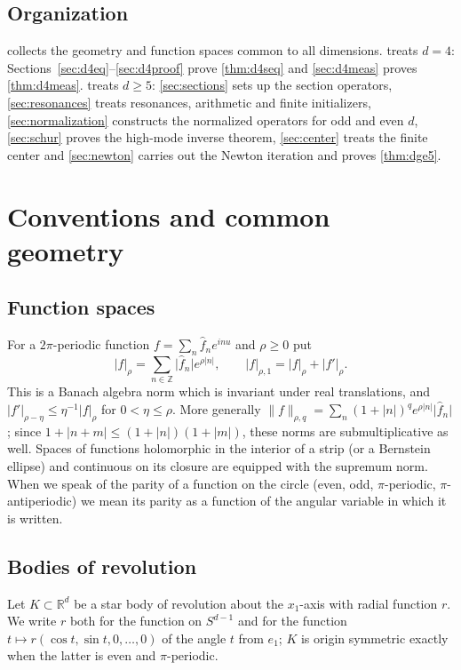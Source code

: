 \documentclass[11pt]{amsart}
\numberwithin{equation}{section}
\theoremstyle{definition}
\theoremstyle{remark}
\newcommand{\R}{\mathbb{R}}
\newcommand{\Z}{\mathbb{Z}}
\newcommand{\abs}[1]{\lvert #1\rvert}
\newcommand{\norm}[1]{\lVert #1\rVert}
\begin{document}
\subsection{Organization}
 collects the geometry and function spaces common to all dimensions.  treats $d=4$: Sections~\ref{sec:d4eq}--\ref{sec:d4proof} prove \cref{thm:d4seq} and \cref{sec:d4meas} proves \cref{thm:d4meas}.  treats $d\ge5$: \cref{sec:sections} sets up the section operators, \cref{sec:resonances} treats resonances, arithmetic and finite initializers, \cref{sec:normalization} constructs the normalized operators for odd and even $d$, \cref{sec:schur} proves the high-mode inverse theorem, \cref{sec:center} treats the finite center and \cref{sec:newton} carries out the Newton iteration and proves \cref{thm:dge5}.

\section{Conventions and common geometry}\label{sec:geometry}

\subsection{Function spaces}
For a $2\pi$-periodic function $f=\sum_n\hat f_ne^{inu}$ and $\rho\ge0$ put
\[
\abs{f}_{\rho}=\sum_{n\in\Z}\abs{\hat f_n}e^{\rho\abs n},\qquad \abs{f}_{\rho,1}=\abs f_\rho+\abs{f'}_\rho .
\]
This is a Banach algebra norm which is invariant under real translations, and $\abs{f'}_{\rho-\eta}\le\eta^{-1}\abs f_\rho$ for $0<\eta\le\rho$. More generally $\norm f_{\rho,q}=\sum_n(1+\abs n)^q e^{\rho\abs n}\abs{\hat f_n}$; since $1+\abs{n+m}\le(1+\abs n)(1+\abs m)$, these norms are submultiplicative as well. Spaces of functions holomorphic in the interior of a strip (or a Bernstein ellipse) and continuous on its closure are equipped with the supremum norm. When we speak of the parity of a function on the circle (even, odd, $\pi$-periodic, $\pi$-antiperiodic) we mean its parity as a function of the angular variable in which it is written.

\subsection{Bodies of revolution}
Let $K\subset\R^d$ be a star body of revolution about the $x_1$-axis with radial function $r$. We write $r$ both for the function on $S^{d-1}$ and for the function $t\mapsto r(\cos t,\sin t,0,\dots,0)$ of the angle $t$ from $e_1$; $K$ is origin symmetric exactly when the latter is even and $\pi$-periodic.
\end{document}
